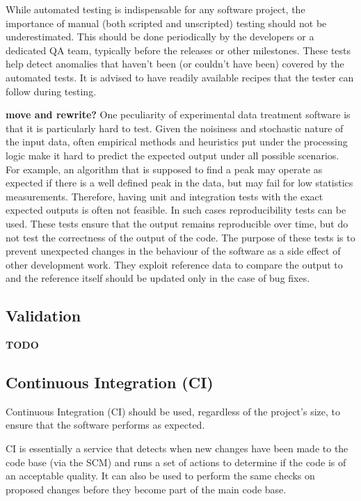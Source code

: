 \documentclass[jnr]{iosart2x}
\newcommand{\todo}[1]{\textbf{#1}}
\begin{document}
While automated testing is indispensable for any software project, the importance of manual (both scripted and unscripted) testing should not be underestimated.
This should be done periodically by the developers or a dedicated QA team, typically before the releases or other milestones.
These tests help detect anomalies that haven't been (or couldn't have been) covered by the automated tests.
It is advised to have readily available recipes that the tester can follow during testing.

\todo{move and rewrite?}
One peculiarity of experimental data treatment software is that it is particularly hard to test.
Given the noisiness and stochastic nature of the input data, often empirical methods and heuristics put under the processing logic make it hard to predict the expected output under all possible scenarios.
For example, an algorithm that is supposed to find a peak may operate as expected if there is a well defined peak in the data, but may fail for low statistics measurements.
Therefore, having unit and integration tests with the exact expected outputs is often not feasible.
In such cases reproducibility tests can be used.
These tests ensure that the output remains reproducible over time, but do not test the correctness of the output of the code.
The purpose of these tests is to prevent unexpected changes in the behaviour of the software as a side effect of other development work.
They exploit reference data to compare the output to and the reference itself should be updated only in the case of bug fixes.

\subsection{Validation}
\label{Validation}

\todo{TODO}

\subsection{Continuous Integration (CI)}
\label{Continuous integration}

Continuous Integration (CI) should be used, regardless of the project's size, to ensure that the software performs as expected.

CI is essentially a service that detects when new changes have been made to the code base (via the SCM) and runs a set of actions to determine if the code is of an acceptable quality.
It can also be used to perform the same checks on proposed changes before they become part of the main code base.
\end{document}
